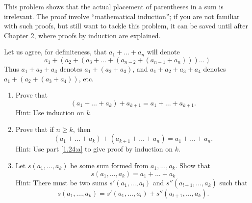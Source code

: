 \begin{pr}[*] \label{1.24} %
  This problem shows that the actual placement of parentheses
  in a sum is irrelevant. The proof involve ``mathematical
  induction''; if you are not familiar with such proofs,
  but still want to tackle this problem, it can be saved
  until after Chapter 2, where proofs by induction are
  explained.
  \par
  \quad
  Let us agree, for definiteness, that
  $a_1 + \dots + a_n$ will denote
  \begin{equation*}
    a_1 + (a_2 + (a_3 + \dots +(a_{n-2}+(a_{n-1} + a_n)))
    \dots)
  \end{equation*}
  Thus $a_1 + a_2 + a_3$ denotes $a_1 + (a_2 + a_3)$,
  and $a_1 + a_2 + a_3 + a_4$ denotes
  $a_1 + (a_2 + (a_3 + a_4))$, etc.
  \begin{enumerate}[label=(\alph*)]
    \item \label{1.24:a}
    Prove that
    \begin{equation*}
      (a_1 + \dots + a_k) + a_{k+1} =
      a_1 + \dots + a_{k+1}.
    \end{equation*}
    Hint: Use induction on $k$.
    \item \label{1.24:b}
    Prove that if $n \geq k$, then
    \begin{equation*}
      (a_1 + \dots + a_k) + (a_{k+1} + \dots + a_n) =
      a_1 + \dots + a_n.
    \end{equation*}
    Hint: Use part \ref{1.24:a} to give proof
    by induction on $k$.
    \item \label{1.24:c}
    Let $s(a_1,\dots,a_k)$ be some sum formed from
    $a_1,\dots,a_k$. Show that
    \begin{equation*}
      s(a_1,\dots,a_k) = a_1 + \dots + a_k
    \end{equation*}
    Hint: There must be two sums $s'(a_1,\dots,a_l)$
    and $s''(a_{l+1},\dots,a_k)$ such that
    \begin{equation*}
      s(a_1,\dots,a_k) = s'(a_1,\dots,a_l)
      + s''(a_{l+1},\dots,a_k).
    \end{equation*}
  \end{enumerate}
\end{pr}

